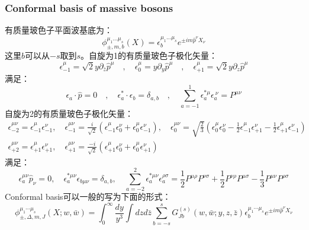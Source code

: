 \subsubsection{Conformal basis of massive bosons}
有质量玻色子平面波基底为：
\begin{equation}
	\phi_{\pm,m,b}^{\mu_1...\mu_s}(X)=\epsilon_b^{\mu_1...\mu_s}e^{\pm im\hat{p}^\nu X_\nu}
\end{equation}
这里$b$可以从$-s$取到$s$。自旋为1的有质量玻色子极化矢量：
\begin{equation}
	\epsilon_{-1}^{\mu}=\sqrt{2}y\partial_{\bar{z}}\hat{p}^{\mu}\quad,\quad\epsilon_{0}^{\mu}=y\partial_{y}\hat{p}^{\mu}\quad,\quad\epsilon_{+1}^{\mu}=\sqrt{2}y\partial_{z}\hat{p}^{\mu}
\end{equation}
满足：
\begin{equation}
	\epsilon_{a}\cdot\hat{p}=0\quad,\quad\epsilon_{a}^{*}\cdot\epsilon_{b}=\delta_{a,b}\quad,\quad\sum_{a=-1}^{1}\epsilon_{a}^{*\mu}\epsilon_{a}^{\:\nu}=P^{\mu\nu}
\end{equation}
自旋为2的有质量玻色子极化矢量：
\begin{equation}
	\begin{array}{l}\epsilon_{-2}^{\mu\nu}=\epsilon_{-1}^{\mu}\epsilon_{-1}^{\nu},\quad\epsilon_{-1}^{\mu\nu}=\frac{i}{\sqrt{2}}\left(\epsilon_{-1}^{\mu}\epsilon_{0}^{\nu}+\epsilon_{0}^{\mu}\epsilon_{-1}^{\nu}\right),\quad\epsilon_{0}^{\mu\nu}=\sqrt{\frac{2}{3}}\left(\epsilon_{0}^{\mu}\epsilon_{0}^{\nu}-\frac{1}{2}\epsilon_{-1}^{\mu}\epsilon_{+1}^{\nu}-\frac{1}{2}\epsilon_{+1}^{\mu}\epsilon_{-1}^{\nu}\right)\\\epsilon_{+2}^{\mu\nu}=\epsilon_{+1}^{\mu}\epsilon_{+1}^{\nu},\quad\epsilon_{+1}^{\mu\nu}=\frac{-i}{\sqrt{2}}\left(\epsilon_{+1}^{\mu}\epsilon_{0}^{\nu}+\epsilon_{0}^{\mu}\epsilon_{+1}^{\nu}\right)\end{array}
\end{equation}
满足：
\begin{equation}
	\epsilon_{a}^{\mu\nu}\hat{p}_{\nu}=0,\quad\epsilon_{a}^{*\mu\nu}\epsilon_{b\mu\nu}=\delta_{a,b},\quad\sum_{a=-2}^{2}\epsilon_{a}^{*\mu\nu}\epsilon_{a}^{\rho\sigma}=\frac{1}{2}P^{\mu\rho}P^{\nu\sigma}+\frac{1}{2}P^{\nu\rho}P^{\mu\sigma}-\frac{1}{3}P^{\mu\nu}P^{\rho\sigma}
\end{equation}
Conformal basis可以一般的写为下面的形式：
\begin{equation}\label{eq:27.77}
	\phi_{\pm,\Delta,m,J}^{\mu_1\cdots\mu_s}(X;w,\bar{w})=\int_{0}^{\infty}\frac{dy}{y^3}\int dzd\bar{z}\sum_{b=-s}^{s}G_{Jb}^{(s)}(w,\bar{w};y,z,\bar{z})\epsilon_{b}^{\mu_1\cdots \mu_s}e^{\pm im\hat{p}^\nu X_\nu}
\end{equation}

